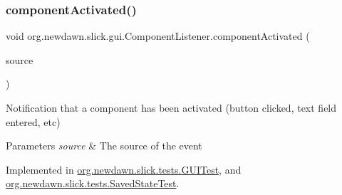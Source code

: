 \subsubsection{\texorpdfstring{component\+Activated()}{componentActivated()}}
{\footnotesize\ttfamily void org.\+newdawn.\+slick.\+gui.\+Component\+Listener.\+component\+Activated (\begin{DoxyParamCaption}\item[{\mbox{\hyperlink{classorg_1_1newdawn_1_1slick_1_1gui_1_1_abstract_component}{Abstract\+Component}}}]{source }\end{DoxyParamCaption})}

Notification that a component has been activated (button clicked, text field entered, etc)


\begin{DoxyParams}{Parameters}
{\em source} & The source of the event \\
\hline
\end{DoxyParams}


Implemented in \mbox{\hyperlink{classorg_1_1newdawn_1_1slick_1_1tests_1_1_g_u_i_test_ac65a0c55d80072f40460633961158f3e}{org.\+newdawn.\+slick.\+tests.\+G\+U\+I\+Test}}, and \mbox{\hyperlink{classorg_1_1newdawn_1_1slick_1_1tests_1_1_saved_state_test_ab9537e69e7a620ccb73d75f6ace818c5}{org.\+newdawn.\+slick.\+tests.\+Saved\+State\+Test}}.

